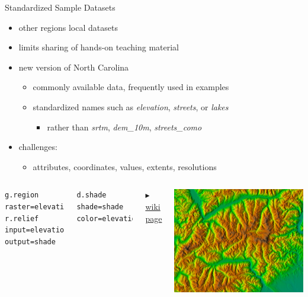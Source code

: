 \documentclass[xcolor={dvipsnames,usenames},beamer]{beamer}
\begin{document}
\begin{frame}[fragile]{Standardized Sample Datasets}

\begin{itemize}
 \item other regions local datasets
 \item limits sharing of hands-on teaching material
 \item new version of North Carolina
 \begin{itemize}
  \item commonly available data, frequently used in examples
  \item standardized names such as \textit{elevation}, \textit{streets}, or \textit{lakes}
  \begin{itemize}
   \item rather than \textit{srtm}, \textit{dem\_10m}, \textit{streets\_como}
  \end{itemize}
 \end{itemize}
 \item challenges:
 \begin{itemize}
  \item attributes, coordinates, values, extents, resolutions
 \end{itemize}

\end{itemize}

\bigskip

\begin{columns}[c]

\scriptsize
\begin{verbatim}
g.region raster=elevation
r.relief input=elevation output=shade
\end{verbatim}
\begin{verbatim}
d.shade shade=shade color=elevation
\end{verbatim}
\vfill\hfill\hfill
\href{http://grasswiki.osgeo.org/wiki/GRASS_GIS_Standardized_Sample_Datasets}{%
$\blacktriangleright$ wiki page}

 \includegraphics[width=\textwidth]{./images/dataset/std_dataset_piemonte_shaded_elevation}%
\end{columns}



\end{frame}
\end{document}
